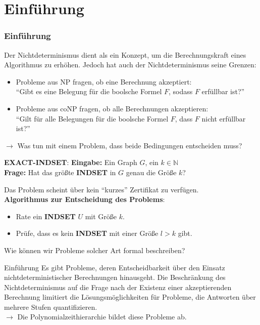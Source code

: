 \section{Einführung}

\begin{frame}
    \frametitle{Einführung}
    Der Nichtdeterminismus dient als ein Konzept, um die Berechnungskraft eines Algorithmus zu erhöhen.
    Jedoch hat auch der Nichtdeterminismus seine Grenzen:
    \begin{itemize}
        \item Probleme aus NP fragen, ob eine Berechnung akzeptiert: \\
         \enquote{Gibt es eine Belegung für die boolsche Formel $F$, sodass $F$ erfüllbar ist?}
        \item Probleme aus coNP fragen, ob alle Berechnungen akzeptieren: \\
          \enquote{Gilt für alle Belegungen für die boolsche Formel $F$, dass $F$ nicht erfüllbar ist?}
    \end{itemize}
    $\rightarrow$ Was tun mit einem Problem, dass beide Bedingungen entscheiden muss?
\end{frame}


 \begin{frame}
    \begin{block}{\textbf{EXACT-INDSET}:}
        \textbf{Eingabe:} Ein Graph $G$, ein $k \in \mathbb{N}$\\ 
        \textbf{Frage:} Hat das größte \textbf{INDSET} in $G$ genau die Größe $k$?
    \end{block}

    Das Problem scheint über kein \enquote{kurzes} Zertifikat zu verfügen. \\
    \textbf{Algorithmus zur Entscheidung des Problems}:
    \begin{itemize}
        \item Rate ein \textbf{INDSET} $U$ mit Größe $k$.
        \item Prüfe, dass es kein \textbf{INDSET} mit einer Größe $l > k$ gibt.
    \end{itemize}
     Wie können wir Probleme solcher Art formal beschreiben?
 \end{frame}
 
 \begin{frame}{Einführung}
    Es gibt Probleme, deren Entscheidbarkeit über den Einsatz nichtdeterministischer Berechnungen hinausgeht.
    Die Beschränkung des Nichtdeterminismus auf die Frage nach der Existenz einer akzeptierenden Berechnung limitiert die Lösungsmöglichkeiten für Probleme,
    die Antworten über mehrere Stufen quantifizieren. \\
    $\rightarrow$ Die Polynomialzeithierarchie bildet diese Probleme ab.
 \end{frame}